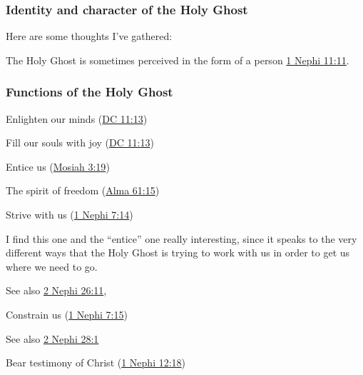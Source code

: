 	
		
	\subsubsection{Identity and character of the Holy Ghost}
		\label{HOLYGHOST-identity}
		
		Here are some thoughts I've gathered:
		
		\begin{compactitem}
			\item The Holy Ghost is sometimes perceived in the form of a person \hyperref[1NEPHI-11-11]{1 Nephi 11:11}.
		\end{compactitem} 
		
	\subsubsection{Functions of the Holy Ghost}
		\label{HOLYGHOST-functions}
		
		\begin{compactitem}
			\item Enlighten our minds (\hyperref[DC11-13]{DC 11:13})
			\item Fill our souls with joy (\hyperref[DC11-13]{DC 11:13})
			\item Entice us (\hyperref[MOSIAH-3-19]{Mosiah 3:19})
			\item The spirit of freedom (\hyperref[ALMA-61-15]{Alma 61:15})
			\item Strive with us (\hyperref[1NEPHI-7-14]{1 Nephi 7:14})
				\begin{compactitem}
					\item I find this one and the ``entice'' one really interesting, since it speaks to the very different ways that the Holy Ghost is trying to work with us in order to get us where we need to go.
					\item See also \hyperref[2NEPHI-26-11]{2 Nephi 26:11}, 
				\end{compactitem}
			\item Constrain us (\hyperref[1NEPHI-7-15]{1 Nephi 7:15})
				\begin{compactitem}
					\item See also \hyperref[2NEPHI-28-1]{2 Nephi 28:1}
				\end{compactitem}
			\item Bear testimony of Christ (\hyperref[1NEPHI-12-18]{1 Nephi 12:18})
		\end{compactitem}